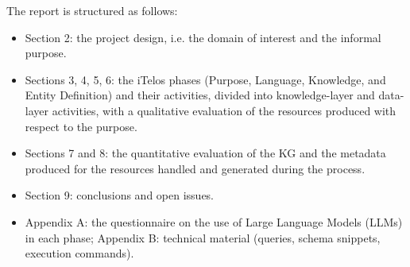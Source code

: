 \noindent The report is structured as follows:
\begin{itemize}
    \item Section 2: the project design, i.e. the domain of interest and the informal purpose.
    \item Sections 3, 4, 5, 6: the iTelos phases (Purpose, Language, Knowledge, and Entity Definition) and their activities, divided into knowledge-layer and data-layer activities, with a qualitative evaluation of the resources produced with respect to the purpose.
    \item Sections 7 and 8: the quantitative evaluation of the KG and the metadata produced for the resources handled and generated during the process.
    \item Section 9: conclusions and open issues.
    \item Appendix A: the questionnaire on the use of Large Language Models (LLMs) in each phase; Appendix B: technical material (queries, schema snippets, execution commands).
\end{itemize}

